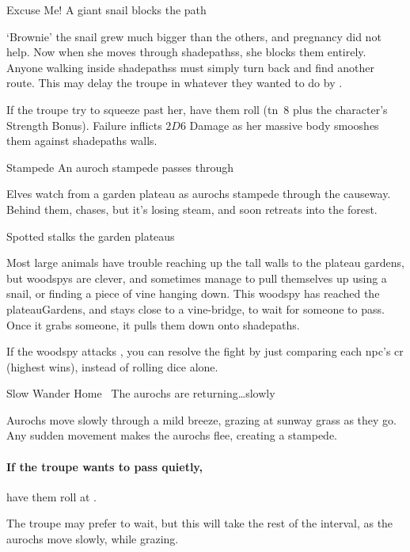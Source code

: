 
{Excuse Me!}%
{A giant snail blocks the path}%

`Brownie' the snail grew much bigger than the others, and pregnancy did not help.
Now when she moves through \glspl{shadepaths}, she blocks them entirely.
Anyone walking inside \glspl{shadepaths} must simply turn back and find another route.
This may delay the troupe in whatever they wanted to do by .

If the troupe try to squeeze past her, have them roll  (\gls{tn}~8 plus the character's Strength Bonus).
Failure inflicts $2D6$ Damage as her massive body smooshes them against \gls{shadepaths} walls.

{Stampede}%
{An auroch stampede passes through}%

Elves watch from a garden plateau as aurochs stampede through the causeway.
Behind them,  chases, but it's losing steam, and soon retreats into the forest.

{ Spotted}%
{ stalks the garden plateaus}%

Most large animals have trouble reaching up the tall walls to the plateau gardens, but \glspl{woodspy} are clever, and sometimes manage to pull themselves up using a snail, or finding a piece of vine hanging down.
This \gls{woodspy} has reached the \gls{plateauGardens}, and stays close to a vine-bridge, to wait for someone to pass.
Once it grabs someone, it pulls them down onto \gls{shadepaths}.

If the \gls{woodspy} attacks , you can resolve the fight by just comparing each \gls{npc}'s \gls{cr} (highest wins), instead of rolling dice alone.

{Slow Wander Home}%
{~The aurochs are returning\ldots slowly}%

Aurochs move slowly through a mild breeze, grazing at \gls{sunway} grass as they go.
Any sudden movement makes the aurochs flee, creating a stampede.

\paragraph{If the troupe wants to pass quietly,}
have them roll  at \tn[8].

The troupe may prefer to wait, but this will take the rest of the \gls{interval}, as the aurochs move slowly, while grazing.

